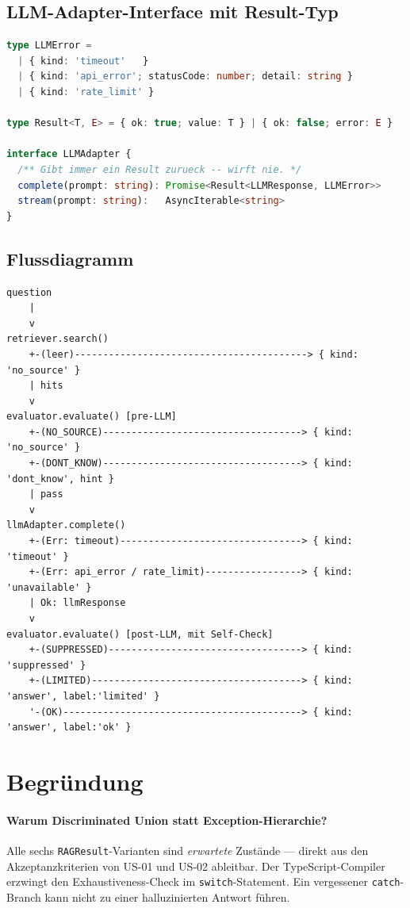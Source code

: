 \documentclass[a4paper, 11pt, oneside]{report}
\newcommand{\code}[1]{\texttt{\small #1}}
\begin{document}
\subsection{LLM-Adapter-Interface mit Result-Typ}

\begin{lstlisting}[language=TypeScript]
type LLMError =
  | { kind: 'timeout'   }
  | { kind: 'api_error'; statusCode: number; detail: string }
  | { kind: 'rate_limit' }

type Result<T, E> = { ok: true; value: T } | { ok: false; error: E }

interface LLMAdapter {
  /** Gibt immer ein Result zurueck -- wirft nie. */
  complete(prompt: string): Promise<Result<LLMResponse, LLMError>>
  stream(prompt: string):   AsyncIterable<string>
}
\end{lstlisting}

\subsection{Flussdiagramm}

\begin{lstlisting}[style=diagram]
question
    |
    v
retriever.search()
    +-(leer)-----------------------------------------> { kind: 'no_source' }
    | hits
    v
evaluator.evaluate() [pre-LLM]
    +-(NO_SOURCE)-----------------------------------> { kind: 'no_source' }
    +-(DONT_KNOW)-----------------------------------> { kind: 'dont_know', hint }
    | pass
    v
llmAdapter.complete()
    +-(Err: timeout)--------------------------------> { kind: 'timeout' }
    +-(Err: api_error / rate_limit)-----------------> { kind: 'unavailable' }
    | Ok: llmResponse
    v
evaluator.evaluate() [post-LLM, mit Self-Check]
    +-(SUPPRESSED)----------------------------------> { kind: 'suppressed' }
    +-(LIMITED)-------------------------------------> { kind: 'answer', label:'limited' }
    '-(OK)------------------------------------------> { kind: 'answer', label:'ok' }
\end{lstlisting}

\section{Begründung}

\paragraph{Warum Discriminated Union statt Exception-Hierarchie?}
Alle sechs \code{RAGResult}-Varianten sind \textit{erwartete} Zustände ---
direkt aus den Akzeptanzkriterien von US-01 und US-02 ableitbar. Der
TypeScript-Compiler erzwingt den Exhaustiveness-Check im
\code{switch}-Statement. Ein vergessener \code{catch}-Branch kann
nicht zu einer halluzinierten Antwort führen.
\end{document}
